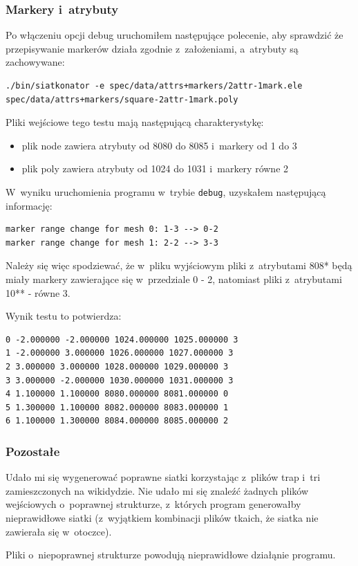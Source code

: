 \documentclass[a4paper]{article} \usepackage{setspace}
\begin{document}
\subsubsection{Markery i~atrybuty}
Po włączeniu opcji debug uruchomiłem następujące polecenie, aby sprawdzić że przepisywanie markerów działa zgodnie z~założeniami, a~atrybuty są zachowywane:

\begin{lstlisting}
./bin/siatkonator -e spec/data/attrs+markers/2attr-1mark.ele spec/data/attrs+markers/square-2attr-1mark.poly
\end{lstlisting}

Pliki wejściowe tego testu mają następującą charakterystykę:
\begin{itemize}
  \item plik node zawiera atrybuty od 8080 do 8085 i~markery od 1 do 3
  \item plik poly zawiera atrybuty od 1024 do 1031 i~markery równe 2
\end{itemize}

W~wyniku uruchomienia programu w~trybie \texttt{debug}, uzyskałem następującą informację:

\begin{lstlisting}
marker range change for mesh 0: 1-3 --> 0-2
marker range change for mesh 1: 2-2 --> 3-3
\end{lstlisting}

Należy się więc spodziewać, że w~pliku wyjściowym pliki z~atrybutami 808* będą miały markery zawierające się w~przedziale 0 - 2, natomiast pliki z~atrybutami 10** - równe 3.

Wynik testu to potwierdza:

\begin{lstlisting}
0 -2.000000 -2.000000 1024.000000 1025.000000 3
1 -2.000000 3.000000 1026.000000 1027.000000 3
2 3.000000 3.000000 1028.000000 1029.000000 3
3 3.000000 -2.000000 1030.000000 1031.000000 3
4 1.100000 1.100000 8080.000000 8081.000000 0
5 1.300000 1.100000 8082.000000 8083.000000 1
6 1.100000 1.300000 8084.000000 8085.000000 2
\end{lstlisting}

\subsubsection{Pozostałe}
Udało mi się wygenerować poprawne siatki korzystając z~plików trap i~tri zamieszczonych na wikidydzie. Nie udało mi się znaleźć żadnych plików wejściowych o~poprawnej strukturze, z~których program generowałby nieprawidłowe siatki (z~wyjątkiem kombinacji plików tkaich, że siatka nie zawierała się w~otoczce).

Pliki o~niepoprawnej strukturze powodują nieprawidłowe działąnie programu.
\end{document}
